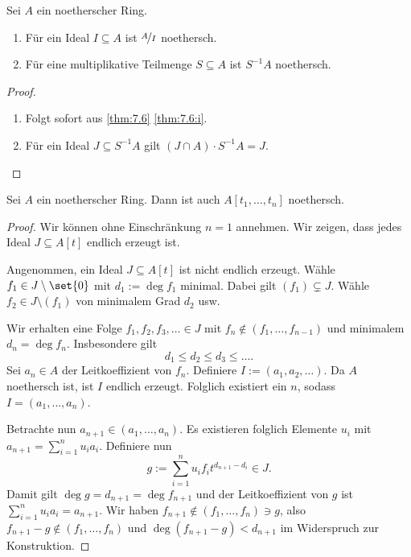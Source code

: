 \documentclass[12pt,a4paper]{scrartcl}
\theoremstyle{cplain}
\theoremstyle{cdef}
\begin{document}
\begin{satz}
	Sei $A$ ein noetherscher Ring.
	\begin{enumerate}
		\item Für ein Ideal $I\subseteq A$ ist $\nicefrac{A}{I}$ noethersch.
		\item Für eine multiplikative Teilmenge $S\subseteq A$ ist $S^{-1}A$ noethersch.
	\end{enumerate}
\end{satz}
\begin{proof}
	\leavevmode
	\begin{enumerate}
		\item Folgt sofort aus \cref{thm:7.6} \ref{thm:7.6:i}.
		\item Für ein Ideal $J\subseteq S^{-1}A$ gilt $(J\cap A) \cdot S^{-1}A = J$.
		\qedhere
	\end{enumerate}
\end{proof}
\begin{satz}
	Sei $A$ ein noetherscher Ring. Dann ist auch $A[t_1,\dots, t_n]$ noethersch.
\end{satz}
\begin{proof}
	Wir können ohne Einschränkung $n = 1$ annehmen. Wir zeigen, dass jedes Ideal $J\subseteq A[t]$ endlich erzeugt ist.
	
	Angenommen, ein Ideal $J\subseteq A[t]$ ist nicht endlich erzeugt. Wähle $f_1\in J\setminus\set{0}$ mit $d_1 := \deg f_1$ minimal. Dabei gilt $(f_1) \subsetneq J$. Wähle $f_2\in J\setminus (f_1)$ von minimalem Grad $d_2$ usw.
	
	Wir erhalten eine Folge $f_1,f_2,f_3,\dots \in J$ mit $f_n\notin (f_1,\dots, f_{n-1})$ und minimalem $d_n = \deg f_n$. Insbesondere gilt
	\[d_1\leq d_2\leq d_3 \leq \dots.\]
	Sei $a_n\in A$ der Leitkoeffizient von $f_n$.
	Definiere $I := (a_1,a_2,\dots)$. Da $A$ noethersch ist, ist $I$ endlich erzeugt. Folglich existiert ein $n$, sodass $I = (a_1,\dots, a_n)$.
	
	Betrachte nun $a_{n+1} \in (a_1,\dots, a_n)$. Es existieren folglich Elemente $u_i$ mit $a_{n+1} = \sum_{i = 1}^n u_ia_i$. Definiere nun
	\[g := \sum_{i = 1}^n u_if_it^{d_{n+1}-d_i} \in J.\]
	Damit gilt $\deg g = d_{n+1} = \deg f_{n+1}$ und der Leitkoeffizient von $g$ ist $\sum_{i = 1}^n u_ia_i = a_{n+1}$.
	Wir haben $f_{n+1}\notin (f_1,\dots, f_n)\ni g$, also $f_{n+1}-g\notin (f_1,\dots, f_n)$ und $\deg(f_{n+1}-g)<d_{n+1}$ im Widerspruch zur Konstruktion.
\end{proof}
\end{document}
